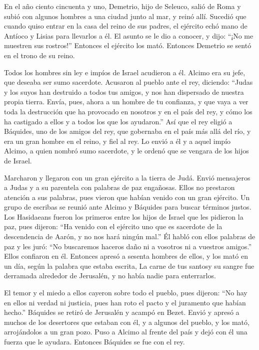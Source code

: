  En el año ciento cincuenta y uno, Demetrio, hijo de
Seleuco, salió de Roma y subió con algunos hombres a una ciudad junto al
mar, y reinó allí.  Sucedió que cuando quiso entrar en la
casa del reino de sus padres, el ejército echó mano de Antíoco y Lisias
para llevarlos a él.  El asunto se le dio a conocer, y
dijo: ``¡No me muestren sus rostros!''  Entonces el
ejército los mató. Entonces Demetrio se sentó en el trono de su reino.

 Todos los hombres sin ley e impíos de Israel acudieron a
él. Alcimo era su jefe, que deseaba ser sumo sacerdote. 
Acusaron al pueblo ante el rey, diciendo: ``Judas y los suyos han
destruido a todos tus amigos, y nos han dispersado de nuestra propia
tierra.  Envía, pues, ahora a un hombre de tu confianza, y
que vaya a ver toda la destrucción que ha provocado en nosotros y en el
país del rey, y cómo los ha castigado a ellos y a todos los que los
ayudaron.''  Así que el rey eligió a Báquides, uno de los
amigos del rey, que gobernaba en el país más allá del río, y era un gran
hombre en el reino, y fiel al rey.  Lo envió a él y a
aquel impío Alcimo, a quien nombró sumo sacerdote, y le ordenó que se
vengara de los hijos de Israel.

 Marcharon y llegaron con un gran ejército a la tierra de
Judá. Envió mensajeros a Judas y a su parentela con palabras de paz
engañosas.  Ellos no prestaron atención a sus palabras,
pues vieron que habían venido con un gran ejército.  Un
grupo de escribas se reunió ante Alcimo y Báquides para buscar términos
justos.  Los Hasidaeans fueron los primeros entre los
hijos de Israel que les pidieron la paz,  pues dijeron:
``Ha venido con el ejército uno que es sacerdote de la descendencia de
Aarón, y no nos hará ningún mal.''  Él habló con ellos
palabras de paz y les juró: ``No buscaremos haceros daño ni a vosotros
ni a vuestros amigos.''  Ellos confiaron en él. Entonces
apresó a sesenta hombres de ellos, y los mató en un día, según la
palabra que estaba escrita,  La carne de tus santosy su
sangre fue derramada alrededor de Jerusalén, y no había nadie para
enterrarlos.

 El temor y el miedo a ellos cayeron sobre todo el
pueblo, pues dijeron: ``No hay en ellos ni verdad ni justicia, pues han
roto el pacto y el juramento que habían hecho.'' 
Báquides se retiró de Jerusalén y acampó en Bezet. Envió y apresó a
muchos de los desertores que estaban con él, y a algunos del pueblo, y
los mató, arrojándolos a un gran pozo.  Puso a Alcimo al
frente del país y dejó con él una fuerza que le ayudara. Entonces
Báquides se fue con el rey.

